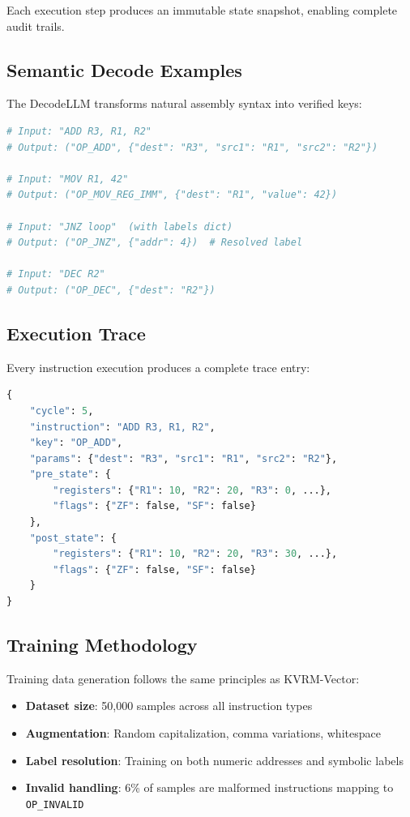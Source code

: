 \documentclass[11pt,a4paper]{article}
\begin{document}
Each execution step produces an immutable state snapshot, enabling complete audit trails.

\subsection{Semantic Decode Examples}

The DecodeLLM transforms natural assembly syntax into verified keys:

\begin{lstlisting}[language=Python,caption={KVRM-CPU Semantic Decode Examples}]
# Input: "ADD R3, R1, R2"
# Output: ("OP_ADD", {"dest": "R3", "src1": "R1", "src2": "R2"})

# Input: "MOV R1, 42"
# Output: ("OP_MOV_REG_IMM", {"dest": "R1", "value": 42})

# Input: "JNZ loop"  (with labels dict)
# Output: ("OP_JNZ", {"addr": 4})  # Resolved label

# Input: "DEC R2"
# Output: ("OP_DEC", {"dest": "R2"})
\end{lstlisting}

\subsection{Execution Trace}

Every instruction execution produces a complete trace entry:

\begin{lstlisting}[language=Python,caption={KVRM-CPU Execution Trace Entry}]
{
    "cycle": 5,
    "instruction": "ADD R3, R1, R2",
    "key": "OP_ADD",
    "params": {"dest": "R3", "src1": "R1", "src2": "R2"},
    "pre_state": {
        "registers": {"R1": 10, "R2": 20, "R3": 0, ...},
        "flags": {"ZF": false, "SF": false}
    },
    "post_state": {
        "registers": {"R1": 10, "R2": 20, "R3": 30, ...},
        "flags": {"ZF": false, "SF": false}
    }
}
\end{lstlisting}

\subsection{Training Methodology}

Training data generation follows the same principles as KVRM-Vector:

\begin{itemize}
    \item \textbf{Dataset size}: 50,000 samples across all instruction types
    \item \textbf{Augmentation}: Random capitalization, comma variations, whitespace
    \item \textbf{Label resolution}: Training on both numeric addresses and symbolic labels
    \item \textbf{Invalid handling}: 6\% of samples are malformed instructions mapping to \texttt{OP\_INVALID}
\end{itemize}
\end{document}
